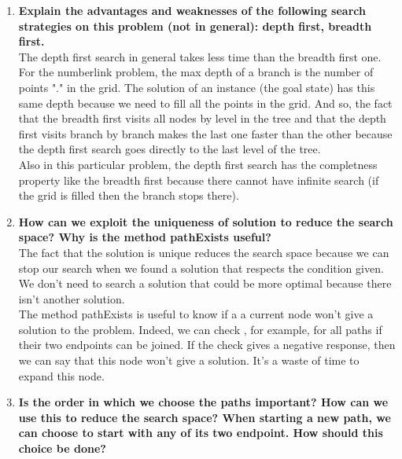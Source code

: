 \documentclass[10pt,a4paper]{article}
\begin{document}
\begin{enumerate}
	
	\item \textbf{ Explain the advantages and weaknesses of the following search strategies on this problem (not in general): depth first, breadth first.} \\
	
	The depth first search in general takes less time than the breadth first one. For the numberlink problem, the max depth of a branch is the number of points "." in the grid. The solution of an instance (the goal state) has this same depth because we need to fill all the points in the grid. And so, the fact that the breadth first visits all nodes by level in the tree and that the depth first visits branch by branch makes the last one faster than the other because the depth first search goes directly to the last level of the tree.\\
	
	 Also in this particular problem, the depth first search has the completness property like the breadth first because there cannot have infinite search (if the grid is filled then the branch stops there). \\
		
	\item \textbf{How can we exploit the uniqueness of solution to reduce the search space? Why is the method pathExists useful?} \\


	The fact that the solution is unique reduces the search space because we can stop our search when  we found a solution that respects the condition given. We don't need to search a solution that could be more optimal because there isn't another solution. \\
	
	The method pathExists is useful to know if a a current node won't give a solution to the problem. Indeed, we can check , for example, for all paths if their two endpoints can be joined. If the check gives a negative response, then we can say that this node won't give a solution. It's a waste of time to expand this node.\\	
	
	\item \textbf{Is the order in which we choose the paths important? How can we use this to reduce the search space? When starting a new path, we can choose to start with any of its two endpoint. How should this choice be done?} \\
	

\end{enumerate}
\end{document}
